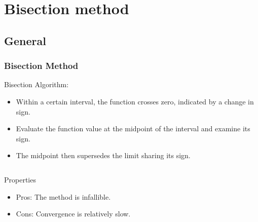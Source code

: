 \section{Bisection method}
\subsection*{General}
\begin{frame}[fragile]
  \frametitle{Bisection Method}

  Bisection Algorithm:
  \begin{itemize}
    \item Within a certain interval, the function crosses zero, indicated by a change in sign.
    \item Evaluate the function value at the midpoint of the interval and examine its sign.
    \item The midpoint then supersedes the limit sharing its sign.
  \end{itemize}

  \begin{columns}
    \vspace{0.5cm}
    \centering
    

    \begin{block}{Properties}
      \begin{itemize}
        \item Pros: The method is infallible.
        \item Cons: Convergence is relatively slow.
      \end{itemize}
    \end{block}
  \end{columns}
\end{frame}




